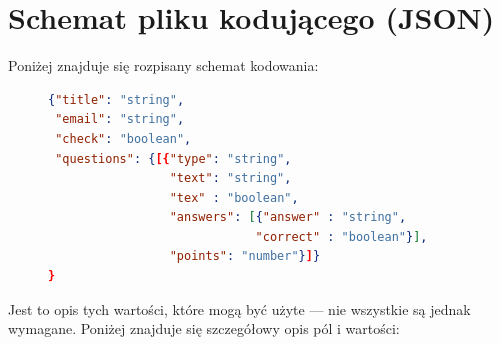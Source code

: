 \section{Schemat pliku kodującego (JSON)}
Poniżej znajduje się rozpisany schemat kodowania: 
\begin{figure}[H]
\begin{lstlisting}[language=json,firstnumber=1]
{"title": "string",
 "email": "string",
 "check": "boolean",
 "questions": {[{"type": "string", 
                 "text": "string",
                 "tex" : "boolean",
                 "answers": [{"answer" : "string",
                             "correct" : "boolean"}],
                 "points": "number"}]}
}

\end{lstlisting}
\end{figure}
Jest to opis tych wartości, które mogą być użyte --- nie wszystkie są jednak  wymagane. Poniżej znajduje się szczegółowy opis pól i wartości:
